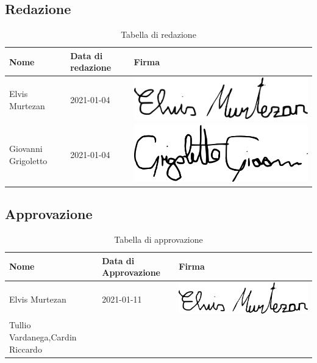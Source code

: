 \subsection{Redazione}
{
	\renewcommand{\arraystretch}{2}
	\begin{longtable}{ C{5cm} C{4cm} C{5cm} }
		\caption{Tabella di redazione}\\
		\rowcolor{\primaryColor}
        \textcolor{\secondaryColor}{\textbf{Nome}} & \textcolor{\secondaryColor}{\textbf{Data di redazione}} & \textcolor{\secondaryColor}{\textbf{Firma}}\\ \endhead        		
		{Elvis Murtezan} & 2021-01-04 & \includegraphics[scale=0.20]{./src/Organigramma/immagini/firme/Elvis.png}\\
		{Giovanni Grigoletto} & 2021-01-04 & \includegraphics[scale=0.20]{./src/Organigramma/immagini/firme/giovanni.png}\\
	\end{longtable}
}

\subsection{Approvazione}
{
	\renewcommand{\arraystretch}{2}
	\centering
	\begin{longtable}{ C{5cm} C{4cm} C{5cm} }
		\caption{Tabella di approvazione}\\
		\rowcolor{\primaryColor}
        \textcolor{\secondaryColor}{\textbf{Nome}} & \textcolor{\secondaryColor}{\textbf{Data di Approvazione}} & \textcolor{\secondaryColor}{\textbf{Firma}}\\	\endhead
		{Elvis Murtezan} & 2021-01-11 & \includegraphics[scale=0.20]{./src/Organigramma/immagini/firme/Elvis.png}\\
		{Tullio Vardanega,Cardin Riccardo} &  &   \\
	\end{longtable}
}

